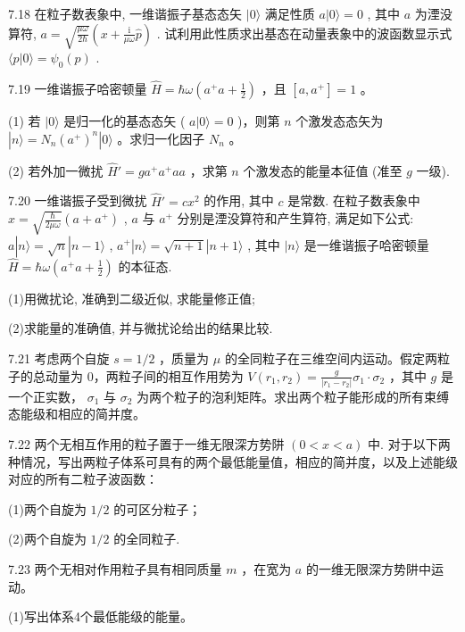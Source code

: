 \vfill\newpage

7.18 在粒子数表象中, 一维谐振子基态态矢 $|0\rangle$ 满足性质 $a|0\rangle = 0$ , 其中 $a$ 为湮没算符, $a = \sqrt{\frac{\mu\omega}{2\hbar}}\left(x + \frac{\mathrm{i}}{\mu\omega}\hat{p}\right)$ . 试利用此性质求出基态在动量表象中的波函数显示式 $\langle p|0\rangle = \psi_0(p)$ .

\vfill\newpage

7.19 一维谐振子哈密顿量 $\hat{H} = \hbar \omega\left(a^{+}a + \frac{1}{2}\right)$ ，且 $[a, a^{+}] = 1$ 。 

(1) 若 $|0\rangle$ 是归一化的基态态矢 ( $a|0\rangle = 0$ )，则第 $n$ 个激发态态矢为 $|n\rangle = N_{n}(a^{+})^{n}|0\rangle$ 。求归一化因子 $N_{n}$ 。

(2) 若外加一微扰 $\hat{H}' = ga^{+}a^{+}aa$ ，求第 $n$ 个激发态的能量本征值 (准至 $g$ 一级).

\vfill\newpage

7.20 一维谐振子受到微扰 $\hat{H}' = cx^2$ 的作用, 其中 $c$ 是常数. 在粒子数表象中 $x = \sqrt{\frac{\hbar}{2\mu\omega}} (a + a^{+})$ , $a$ 与 $a^{+}$ 分别是湮没算符和产生算符, 满足如下公式: $a|n\rangle = \sqrt{n}|n - 1\rangle$ , $a^{+}|n\rangle = \sqrt{n + 1}|n + 1\rangle$ , 其中 $|n\rangle$ 是一维谐振子哈密顿量 $\hat{H} = \hbar\omega\left(a^{+}a + \frac{1}{2}\right)$ 的本征态. 

(1)用微扰论, 准确到二级近似, 求能量修正值; 

(2)求能量的准确值, 并与微扰论给出的结果比较.

\vfill\newpage

7.21 考虑两个自旋 $s = 1 / 2$ ，质量为 $\mu$ 的全同粒子在三维空间内运动。假定两粒子的总动量为 0，两粒子间的相互作用势为 $V(r_1, r_2) = \frac{g}{|r_1 - r_2|} \sigma_1 \cdot \sigma_2$ ，其中 $g$ 是一个正实数， $\sigma_1$ 与 $\sigma_2$ 为两个粒子的泡利矩阵。求出两个粒子能形成的所有束缚态能级和相应的简并度。

\vfill\newpage

7.22 两个无相互作用的粒子置于一维无限深方势阱 $(0 < x < a)$ 中. 对于以下两种情况，写出两粒子体系可具有的两个最低能量值，相应的简并度，以及上述能级对应的所有二粒子波函数：

(1)两个自旋为 $1/2$ 的可区分粒子；

(2)两个自旋为 $1/2$ 的全同粒子.

\vfill\newpage

7.23 两个无相对作用粒子具有相同质量 $m$ ，在宽为 $a$ 的一维无限深方势阱中运动。

(1)写出体系4个最低能级的能量。

